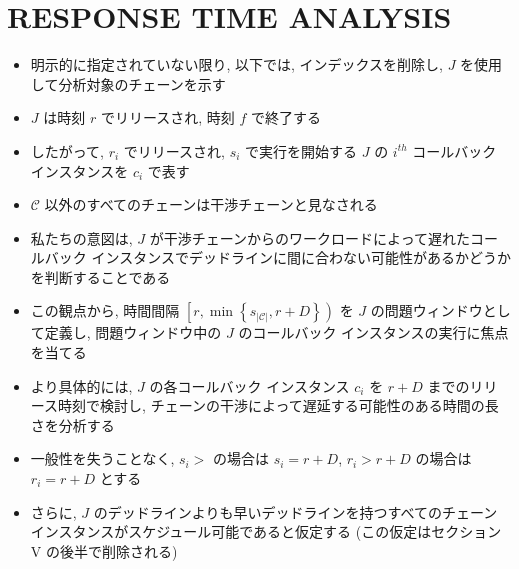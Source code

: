 \section{RESPONSE TIME ANALYSIS}
\label{sec: responce_time_analysys}


\begin{frame}{}
    \begin{itemize}
        \item 明示的に指定されていない限り, 以下では, インデックスを削除し, $J$ を使用して分析対象のチェーンを示す
        \item $J$ は時刻 $r$ でリリースされ, 時刻 $f$ で終了する
        \item したがって, $r_{i}$ でリリースされ, $s_{i}$ で実行を開始する $J$ の $i^{t h}$ コールバック インスタンスを $c_{i}$ で表す
        \item $\mathcal{C}$ 以外のすべてのチェーンは干渉チェーンと見なされる
    \end{itemize}
\end{frame}

\begin{frame}{}
    \begin{itemize}
        \item 私たちの意図は, $J$ が干渉チェーンからのワークロードによって遅れたコールバック インスタンスでデッドラインに間に合わない可能性があるかどうかを判断することである
        \item この観点から, 時間間隔 $\left[r, \min \left\{s_{|\mathcal{C}|}, r+D\right\}\right)$ を $J$ の問題ウィンドウとして定義し, 問題ウィンドウ中の $J$ のコールバック インスタンスの実行に焦点を当てる
        \item より具体的には, $J$ の各コールバック インスタンス $c_{i}$ を $r+D$ までのリリース時刻で検討し, チェーンの干渉によって遅延する可能性のある時間の長さを分析する
    \end{itemize}
\end{frame}

\begin{frame}{}
    \begin{itemize}
        \item 一般性を失うことなく, $s_{i}>$ の場合は $s_{i}=r+D$, $r_{i}>r+D$ の場合は $r_{i}=r+D$ とする
        \item さらに,  $J$ のデッドラインよりも早いデッドラインを持つすべてのチェーン インスタンスがスケジュール可能であると仮定する (この仮定はセクション V の後半で削除される)
    \end{itemize}
\end{frame}

